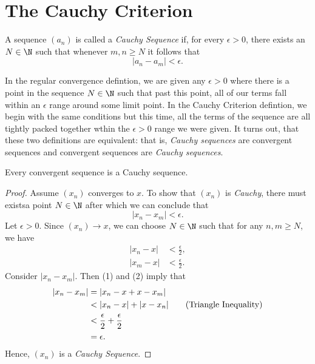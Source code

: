 \section{The Cauchy Criterion}


\begin{tcolorbox}
\begin{defn}
A sequence \((a_n)\) is called a \textit{Cauchy Sequence} if, for every \( \epsilon > 0 \), there exists an \( N \in \N \) such that whenever \( m,n \geq N \) it follows that 
\[ | a_n - a_m | < \epsilon.\]
\end{defn}
\end{tcolorbox}

In the regular convergence defintion, we are given any \( \epsilon > 0 \) where there is a point in the sequence \(N \in \N \) such that past this point, all of our terms fall within an \(\epsilon\) range around some limit point. In the Cauchy Criterion defintion, we begin with the same conditions but this time, all the terms of the sequence are all tightly packed together wthin the \(\epsilon > 0 \) range we were given. It turns out, that these two definitions are equivalent: that is, \textit{Cauchy sequences} are convergent sequences and convergent sequences are \textit{Cauchy sequences}. 

\begin{tcolorbox}
\begin{thm}
Every convergent sequence is a Cauchy sequence. 
\end{thm}
\end{tcolorbox}

\begin{proof}
Assume \((x_n)\) converges to \(x\). To show that \((x_n)\) is \textit{Cauchy}, there must existsa point \( N \in \N \) after which we can conclude that 
\[ |x_n - x_m| < \epsilon. \]
Let \( \epsilon > 0 \). Since \( (x_n) \to x \), we can choose \( N \in \N \) such that for any \( n,m \geq N \), we have 
\begin{align*}
    |x_n - x|&< \frac{\epsilon}{2}, \tag{1} \\
    |x_m - x|&< \frac{\epsilon}{2}. \tag{2}
\end{align*}
Consider \( |x_n - x_m| \). Then (1) and (2) imply that 
\begin{align*}
    |x_n - x_m|&= |x_n - x + x - x_m| \\
               &< | x_n - x | + | x - x_n | \tag{\text{Triangle Inequality}}\\  
               &< \frac{\epsilon}{2} + \frac{\epsilon}{2} \\
               &= \epsilon.
\end{align*}
Hence, \((x_n)\) is a \textit{Cauchy Sequence}.
\end{proof}

